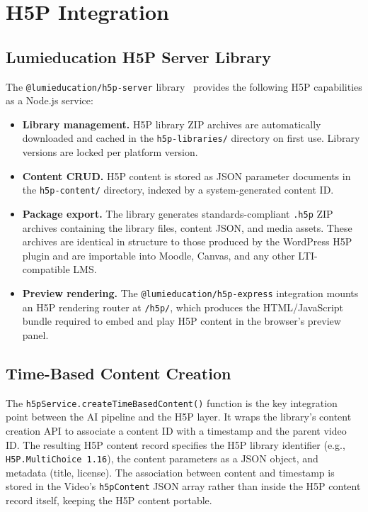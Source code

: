 \section{H5P Integration}

\subsection{Lumieducation H5P Server Library}

The \texttt{@lumieducation/h5p-server} library~\cite{lumieducation2023}
provides the following H5P capabilities as a Node.js service:

\begin{itemize}
  \item \textbf{Library management.} H5P library ZIP archives are
  automatically downloaded and cached in the \texttt{h5p-libraries/}
  directory on first use. Library versions are locked per platform version.

  \item \textbf{Content CRUD.} H5P content is stored as JSON parameter
  documents in the \texttt{h5p-content/} directory, indexed by a
  system-generated content ID.

  \item \textbf{Package export.} The library generates standards-compliant
  \texttt{.h5p} ZIP archives containing the library files, content JSON,
  and media assets. These archives are identical in structure to those
  produced by the WordPress H5P plugin and are importable into Moodle,
  Canvas, and any other LTI-compatible LMS.

  \item \textbf{Preview rendering.} The \texttt{@lumieducation/h5p-express}
  integration mounts an H5P rendering router at \texttt{/h5p/}, which
  produces the HTML/JavaScript bundle required to embed and play H5P content
  in the browser's preview panel.
\end{itemize}

\subsection{Time-Based Content Creation}

The \texttt{h5pService.createTimeBasedContent()} function is the key
integration point between the AI pipeline and the H5P layer. It wraps the
library's content creation API to associate a content ID with a timestamp
and the parent video ID. The resulting H5P content record specifies the
H5P library identifier (e.g., \texttt{H5P.MultiChoice 1.16}), the content
parameters as a JSON object, and metadata (title, license). The association
between content and timestamp is stored in the Video's \texttt{h5pContent}
JSON array rather than inside the H5P content record itself, keeping the
H5P content portable.


